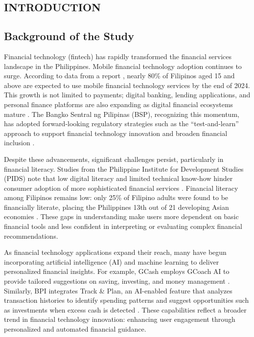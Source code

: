 \documentclass{icsthesis}
\begin{document}
	\begin{mainmatter}
		\section{INTRODUCTION}
			\subsection{Background of the Study}
				Financial technology (fintech) has rapidly transformed the financial services landscape in the Philippines. Mobile financial technology adoption continues to surge. According to data from a report \cite{ref1}, nearly 80\% of Filipinos aged 15 and above are expected to use mobile financial technology services by the end of 2024. This growth is not limited to payments; digital banking, lending applications, and personal finance platforms are also expanding as digital financial ecosystems mature \cite{ref2}. The Bangko Sentral ng Pilipinas (BSP), recognizing this momentum, has adopted forward-looking regulatory strategies such as the ``test-and-learn'' approach to support financial technology innovation and broaden financial inclusion \cite{ref3}.

                Despite these advancements, significant challenges persist, particularly in financial literacy. Studies from the Philippine Institute for Development Studies (PIDS) note that low digital literacy and limited technical know-how hinder consumer adoption of more sophisticated financial services \cite{ref4}. Financial literacy among Filipinos remains low: only 25\% of Filipino adults were found to be financially literate, placing the Philippines 13th out of 21 developing Asian economies \cite{ref5}. These gaps in understanding make users more dependent on basic financial tools and less confident in interpreting or evaluating complex financial recommendations.

                As financial technology applications expand their reach, many have begun incorporating artificial intelligence (AI) and machine learning to deliver personalized financial insights. For example, GCash employs GCoach AI to provide tailored suggestions on saving, investing, and money management \cite{ref6}. Similarly, BPI integrates Track \& Plan, an AI-enabled feature that analyzes transaction histories to identify spending patterns and suggest opportunities such as investments when excess cash is detected \cite{ref7}. These capabilities reflect a broader trend in financial technology innovation: enhancing user engagement through personalized and automated financial guidance.


\end{mainmatter}
\end{document}
